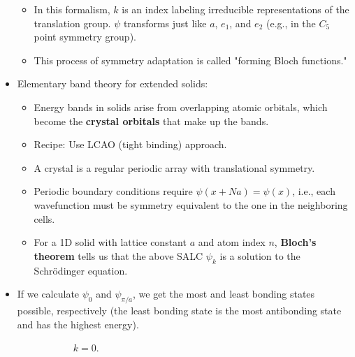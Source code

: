 \documentclass[../notes.tex]{subfiles}
\begin{document}
\begin{itemize}
\begin{itemize}
        \item In this formalism, $k$ is an index labeling irreducible representations of the translation group. $\psi$ transforms just like $a$, $e_1$, and $e_2$ (e.g., in the $C_5$ point symmetry group).
        \item This process of symmetry adaptation is called "forming Bloch functions."
    \end{itemize}
    \item Elementary band theory for extended solids:
    \begin{itemize}
        \item Energy bands in solids arise from overlapping atomic orbitals, which become the \textbf{crystal orbitals} that make up the bands.
        \item Recipe: Use LCAO (tight binding) approach.
        \item A crystal is a regular periodic array with translational symmetry.
        \item Periodic boundary conditions require $\psi(x+Na)=\psi(x)$, i.e., each wavefunction must be symmetry equivalent to the one in the neighboring cells.
        \item For a 1D solid with lattice constant $a$ and atom index $n$, \textbf{Bloch's theorem} tells us that the above SALC $\psi_k$ is a solution to the Schr\"{o}dinger equation.
    \end{itemize}
    \item If we calculate $\psi_0$ and $\psi_{\pi/a}$, we get the most and least bonding states possible, respectively (the least bonding state is the most antibonding state and has the highest energy).
    \begin{figure}[h!]
        \centering
        \begin{subfigure}[b]{0.35\linewidth}
            \centering
            \caption{$k=0$.}
            \label{fig:bandBonding-sa}
        \end{subfigure}
        \begin{subfigure}[b]{0.35\linewidth}
            \centering
\end{subfigure}
\end{figure}
\end{itemize}
\end{document}
